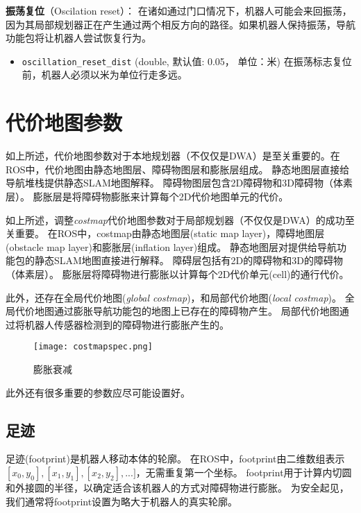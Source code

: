 \textbf{振荡复位}（Oscilation reset）：
在诸如通过门口情况下，机器人可能会来回振荡，因为其局部规划器正在产生通过两个相反方向的路径。如果机器人保持振荡，导航功能包将让机器人尝试恢复行为。

\begin{itemize}
	\item \texttt{oscillation_reset_dist} (double, 默认值: 0.05， 单位：米) 
	在振荡标志复位前，机器人必须以米为单位行走多远。
\end{itemize}



\section[Costmap Parameters]{代价地图参数}
如上所述，代价地图参数对于本地规划器（不仅仅是DWA）是至关重要的。在ROS中，代价地图由静态地图层、障碍物图层和膨胀层组成。
静态地图层直接给导航堆栈提供静态SLAM地图解释。
障碍物图层包含2D障碍物和3D障碍物（体素层）。
膨胀层是将障碍物膨胀来计算每个2D代价地图单元的代价。

如上所述，调整\textit{costmap}代价地图参数对于局部规划器（不仅仅是DWA）的成功至关重要。 
在ROS中，costmap由静态地图层(static map layer)，障碍地图层(obstacle map layer)和膨胀层(inflation layer)组成。 
静态地图层对提供给导航功能包的静态SLAM地图直接进行解释。 
障碍层包括有2D的障碍物和3D的障碍物（体素层）。 
膨胀层将障碍物进行膨胀以计算每个2D代价单元(cell)的通行代价。

此外，还存在全局代价地图(\textit{global costmap})，和局部代价地图(\textit{local costmap})。
全局代价地图通过膨胀导航功能包的地图上已存在的障碍物产生。
局部代价地图通过将机器人传感器检测到的障碍物进行膨胀产生的。

\begin{figure}[!h]
	\texttt{[image: costmapspec.png]}
	\caption{膨胀衰减}
\end{figure}

\noindent 此外还有很多重要的参数应尽可能设置好。

\subsection[footprint]{足迹}%

足迹(footprint)是机器人移动本体的轮廓。
在ROS中，footprint由二维数组表示 $[x_0, y_0], [x_1,y_1], [x_2,y_2], ...]$，无需重复第一个坐标。
footprint用于计算内切圆和外接圆的半径，以确定适合该机器人的方式对障碍物进行膨胀。
为安全起见，我们通常将footprint设置为略大于机器人的真实轮廓。


